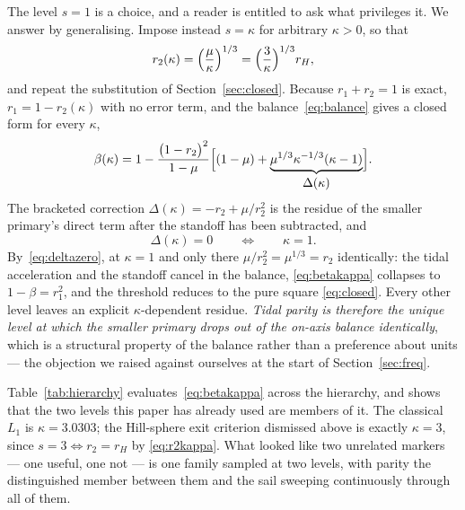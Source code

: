 \documentclass[pdflatex,sn-mathphys-num]{sn-jnl}
\begin{document}
The level $s=1$ is a choice, and a reader is entitled to ask what privileges it.
We answer by generalising. Impose instead $s=\kappa$ for arbitrary $\kappa>0$,
so that
\begin{equation}
  r_2(\kappa) = \Bigl(\frac{\mu}{\kappa}\Bigr)^{1/3}
              = \Bigl(\frac{3}{\kappa}\Bigr)^{1/3} r_H ,
  \label{eq:r2kappa}
\end{equation}
and repeat the substitution of Section~\ref{sec:closed}. Because $r_1+r_2=1$ is
exact, $r_1=1-r_2(\kappa)$ with no error term, and the balance~\eqref{eq:balance}
gives a closed form for every $\kappa$,
\begin{equation}
  \beta(\kappa) = 1 - \frac{\bigl(1-r_2\bigr)^{2}}{1-\mu}
                  \Bigl[(1-\mu) + \underbrace{\mu^{1/3}\kappa^{-1/3}(\kappa-1)}
                  _{\textstyle \Delta(\kappa)}\Bigr] .
  \label{eq:betakappa}
\end{equation}
The bracketed correction $\Delta(\kappa)=-r_2+\mu/r_2^{2}$ is the residue of the
smaller primary's direct term after the standoff has been subtracted, and
\begin{equation}
  \Delta(\kappa)=0 \qquad\Longleftrightarrow\qquad \kappa=1 .
  \label{eq:deltazero}
\end{equation}
By~\eqref{eq:deltazero}, at $\kappa=1$ and only there
$\mu/r_2^{2}=\mu^{1/3}=r_2$ identically: the
tidal acceleration and the standoff cancel in the balance, \eqref{eq:betakappa}
collapses to $1-\beta=r_1^{2}$, and the threshold reduces to the pure square
\eqref{eq:closed}. Every other level leaves an explicit $\kappa$-dependent
residue. \emph{Tidal parity is therefore the unique level at which the smaller
primary drops out of the on-axis balance identically}, which is a structural
property of the balance rather than a preference about units --- the objection
we raised against ourselves at the start of Section~\ref{sec:freq}.

Table~\ref{tab:hierarchy} evaluates~\eqref{eq:betakappa} across the hierarchy,
and shows that the two levels this paper has already used are members of it.
The classical $L_1$ is $\kappa=3.0303$; the Hill-sphere exit criterion
dismissed above is exactly $\kappa=3$, since $s=3\Leftrightarrow r_2=r_H$ by
\eqref{eq:r2kappa}. What looked like two unrelated markers --- one useful, one
not --- is one family sampled at two levels, with parity the distinguished
member between them and the sail sweeping continuously through all of them.
\end{document}
